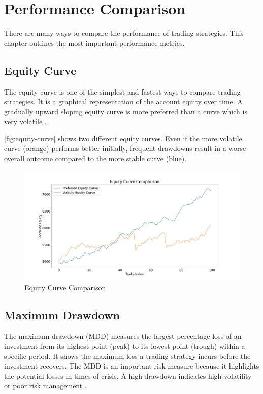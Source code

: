 \section{Performance Comparison}
\label{chap:performance}

There are many ways to compare the performance of trading strategies.
This chapter outlines the most important performance metrics.


\subsection{Equity Curve}
\label{chap:equity-curve}

The equity curve is one of the simplest and fastest ways to compare trading strategies.
It is a graphical representation of the account equity over time.
A gradually upward sloping equity curve is more preferred than a curve which is very volatile \cite{performace}.

\autoref{fig:equity-curve} shows two different equity curves.
Even if the more volatile curve (orange) performs better initially, frequent drawdowns result in a worse overall outcome compared to the more stable curve (blue).


\begin{figure}[H]
    \centering
    \includegraphics[width=\textwidth]{images/trading-strategies/equity-curve}
    \caption{Equity Curve Comparison}
    \label{fig:equity-curve}
\end{figure}

\subsection{Maximum Drawdown}

The maximum drawdown (MDD) measures the largest percentage loss of an investment from its highest point (peak) to its lowest point (trough) within a specific period.
It shows the maximum loss a trading strategy incurs before the investment recovers.
The MDD is an important risk measure because it highlights the potential losses in times of crisis.
A high drawdown indicates high volatility or poor risk management \cite{mdd}.

